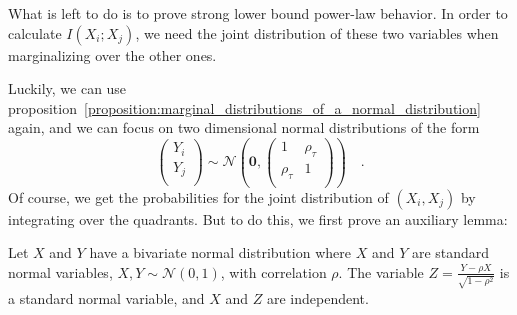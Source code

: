 \documentclass[../../main.tex]{subfiles}
\begin{document}
\bigskip
What is left to do is to prove strong lower bound power-law behavior. In order to calculate $I(X_i; X_j)$, we need the joint distribution of these two variables when marginalizing over the other ones.

Luckily, we can use proposition~\ref{proposition:marginal_distributions_of_a_normal_distribution} again, and we can focus on two dimensional normal distributions of the form
\[
    \begin{pmatrix*}
        Y_i \\
        Y_j \\
    \end{pmatrix*}
    \sim \mathcal{N}\left(\bm{0}, \begin{pmatrix*}
        1 & \rho_\tau \\
        \rho_\tau & 1 \\
    \end{pmatrix*}\right)
    \quad .
\]
Of course, we get the probabilities for the joint distribution of $(X_i, X_j)$ by integrating over the quadrants. But to do this, we first prove an auxiliary lemma:

\begin{lemma}
Let $X$ and $Y$ have a bivariate normal distribution where $X$ and $Y$ are standard normal variables, $X, Y \sim \mathcal{N}(0,1)$, with correlation $\rho$. The variable $Z = \frac{Y-\rho X}{\sqrt{1-\rho^2}}$ is a standard normal variable, and $X$ and $Z$ are independent.
\end{lemma}
\end{document}
